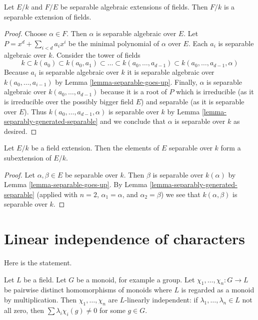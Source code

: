 \begin{lemma}
\label{lemma-separable-permanence}
Let $E/k$ and $F/E$ be separable algebraic extensions of fields. Then $F/k$
is a separable extension of fields.
\end{lemma}

\begin{proof}
Choose $\alpha \in F$. Then $\alpha$ is separable algebraic over $E$.
Let $P = x^d + \sum_{i < d} a_i x^i$ be the minimal polynomial of
$\alpha$ over $E$. Each $a_i$ is separable algebraic over $k$.
Consider the tower of fields
$$
k \subset k(a_0) \subset k(a_0, a_1) \subset \ldots \subset
k(a_0, \ldots, a_{d - 1}) \subset k(a_0, \ldots, a_{d - 1}, \alpha)
$$
Because $a_i$ is separable algebraic over $k$ it is separable algebraic
over $k(a_0, \ldots, a_{i - 1})$ by Lemma \ref{lemma-separable-goes-up}.
Finally, $\alpha$ is separable algebraic over $k(a_0, \ldots, a_{d - 1})$
because it is a root of $P$ which is irreducible
(as it is irreducible over the possibly bigger field $E$)
and separable (as it is separable over $E$).
Thus $k(a_0, \ldots, a_{d - 1}, \alpha)$ is separable over $k$
by Lemma \ref{lemma-separably-generated-separable}
and we conclude that $\alpha$ is separable over $k$ as desired.
\end{proof}

\begin{lemma}
\label{lemma-separable-elements}
Let $E/k$ be a field extension. Then the elements of $E$ separable
over $k$ form a subextension of $E/k$.
\end{lemma}

\begin{proof}
Let $\alpha, \beta \in E$ be separable over $k$. Then $\beta$ is separable
over $k(\alpha)$ by Lemma \ref{lemma-separable-goes-up}.
By Lemma \ref{lemma-separably-generated-separable} (applied with $n = 2$,
$\alpha_1 = \alpha$, and $\alpha_2 = \beta$) we see that
$k(\alpha, \beta)$ is separable over $k$.
\end{proof}





\section{Linear independence of characters}
\label{section-independence-characters}

\noindent
Here is the statement.

\begin{lemma}
\label{lemma-independence-characters}
Let $L$ be a field. Let $G$ be a monoid, for example a group. Let
$\chi_1, \ldots, \chi_n : G \to L$ be pairwise distinct
homomorphisms of monoids where $L$ is regarded as a monoid
by multiplication. Then $\chi_1, \ldots, \chi_n$
are $L$-linearly independent: if $\lambda_1, \ldots, \lambda_n \in L$
not all zero, then $\sum \lambda_i\chi_i(g) \not = 0$
for some $g \in G$.
\end{lemma}

